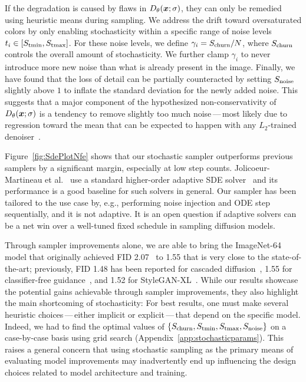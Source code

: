 \documentclass{article}
\begin{document}
If the degradation is caused by flaws in $D_\theta(\boldsymbol{x}; \sigma)$, they can only be remedied using heuristic means during sampling.
We address the drift toward oversaturated colors by only enabling stochasticity within a specific range of noise levels $t_i \in [S_\text{tmin}, S_\text{tmax}]$.
For these noise levels, we define $\gamma_i = S_\text{churn} / N$, where $S_\text{churn}$ controls the overall amount of stochasticity. %
We further clamp $\gamma_i$ to never introduce more new noise than what is already present in the image.
Finally, we have found that the loss of detail can be partially counteracted by setting $S_\text{noise}$ slightly above $1$ to inflate the standard deviation for the newly added noise.
This suggests that a major component of the hypothesized non-conservativity of $D_\theta(\boldsymbol{x};\sigma)$ is a tendency to remove slightly too much noise\,---\,most likely due to {regression toward the mean} that can be expected to happen with any $L_2$-trained denoiser~\cite{Lehtinen2018}.

\figSdePlotNfe


Figure~\ref{fig:SdePlotNfe} shows that our stochastic sampler outperforms previous samplers \cite{Jolicoeur2021,Nichol2021a,Song2021sde} by a significant margin, especially at low step counts.
{Jolicoeur-Martineau et al.~\cite{Jolicoeur2021} use a standard higher-order adaptive SDE solver~\cite{Roberts2012sde} and its performance is a good baseline for such solvers in general.
Our sampler has been tailored to the use case by, e.g., performing noise injection and ODE step sequentially, and it is not adaptive.
It is an open question if adaptive solvers can be a net win over a well-tuned fixed schedule in sampling diffusion models.}

Through sampler improvements alone, we are able to bring the ImageNet-64 model that originally achieved FID 2.07~\cite{Dhariwal2021} to 1.55 that is very close to the state-of-the-art; previously, FID 1.48 has been reported for cascaded diffusion~\cite{Ho2021cascaded}, 1.55 for classifier-free guidance~\cite{Ho2021classifierfree}, and 1.52 for StyleGAN-XL~\cite{Sauer2022}.
While our results showcase the potential gains achievable through sampler improvements, they also highlight the main shortcoming of stochasticity: For best results, one must make several heuristic choices\,---\,either implicit or explicit\,---\,that depend on the specific model.
Indeed, we had to find the optimal values of $\{S_\text{churn}, S_\text{tmin}, S_\text{tmax}, S_\text{noise}\}$ on a case-by-case basis using grid search (Appendix~{\ref{app:stochasticparams}}).
This raises a general concern that using stochastic sampling as the primary means of evaluating model improvements may inadvertently end up influencing the design choices related to model architecture and training.
\end{document}
